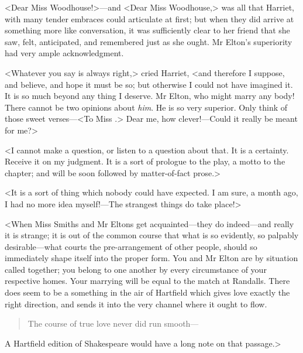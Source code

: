 <Dear Miss Woodhouse!>—and <Dear Miss Woodhouse,> was all that Harriet, with many tender embraces could articulate at first; but when they did arrive at something more like conversation, it was sufficiently clear to her friend that she saw, felt, anticipated, and remembered just as she ought. Mr Elton's superiority had very ample acknowledgment.

<Whatever you say is always right,> cried Harriet, <and therefore I suppose, and believe, and hope it must be so; but otherwise I could not have imagined it. It is so much beyond any thing I deserve. Mr Elton, who might marry any body! There cannot be two opinions about \textit{him}. He is so very superior. Only think of those sweet verses—<To Miss \doubleemdash .> Dear me, how clever!—Could it really be meant for me?>

<I cannot make a question, or listen to a question about that. It is a certainty. Receive it on my judgment. It is a sort of prologue to the play, a motto to the chapter; and will be soon followed by matter-of-fact prose.>

<It is a sort of thing which nobody could have expected. I am sure, a month ago, I had no more idea myself!—The strangest things do take place!>

<When Miss Smiths and Mr Eltons get acquainted—they do indeed—and really it is strange; it is out of the common course that what is so evidently, so palpably desirable—what courts the pre-arrangement of other people, should so immediately shape itself into the proper form. You and Mr Elton are by situation called together; you belong to one another by every circumstance of your respective homes. Your marrying will be equal to the match at Randalls. There does seem to be a something in the air of Hartfield which gives love exactly the right direction, and sends it into the very channel where it ought to flow.

\begin{quote}
The course of true love never did run smooth—
\end{quote}


A Hartfield edition of Shakespeare would have a long note on that passage.>


